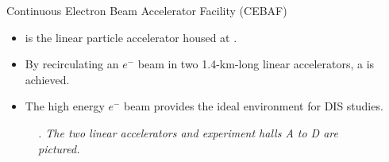 \begin{frame}{Continuous Electron Beam Accelerator Facility (CEBAF)}
    \label{10.31::cebaf}

    \begin{itemize}
        \item
             is the linear particle accelerator housed at .

        \item
            By recirculating an $e^-$ beam in two 1.4-km-long linear accelerators, a   is achieved.

        \item
            The high energy $e^-$ beam provides the ideal environment for DIS studies.
    \end{itemize}

    \begin{center}
        \begin{figure}[t]

            \scriptsize{\textit{
                .
                The two linear accelerators and experiment halls A to D are pictured.
            }}
        \end{figure}
    \end{center}
\end{frame}

